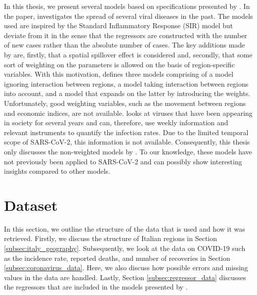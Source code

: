 \documentclass[12pt]{article}
\begin{document}
	In this thesis, we present several models based on specifications presented by \textcite{adda2016economic}. In the paper, \textcite{adda2016economic} investigates the spread of several viral diseases in the past. The models used are inspired by the Standard Inflammatory Response (SIR) model but deviate from it in the sense that the regressors are constructed with the number of new cases rather than the absolute number of cases. The key additions made by \textcite{adda2016economic} are, firstly, that a spatial spillover effect is considered and, secondly, that some sort of weighting on the parameters is allowed on the basis of region-specific variables. With this motivation, \textcite{adda2016economic} defines three models comprising of a model ignoring interaction between regions, a model taking interaction between regions into account, and a model that expands on the latter by introducing the weights. Unfortunately, good weighting variables, such as the movement between regions and economic indices, are not available. \textcite{adda2016economic} looks at viruses that have been appearing in society for several years and can, therefore, use weekly information and relevant instruments to quantify the infection rates. Due to the limited temporal scope of SARS-CoV-2, this information is not available. Consequently, this thesis only discusses the non-weighted models by \textcite{adda2016economic}. To our knowledge, these models have not previously been applied to SARS-CoV-2 and can possibly show interesting insights compared to other models.
	
	\section{Dataset} \label{sec:dataset}
	In this section, we outline the structure of the data that is used and how it was retrieved. Firstly, we discuss the structure of Italian regions in Section \ref{subsec:italy_geography}. Subsequently, we look at the data on COVID-19 such as the incidence rate, reported deaths, and number of recoveries in Section \ref{subsec:coronavirus_data}. Here, we also discuss how possible errors and missing values in the data are handled. Lastly, Section \ref{subsec:regressor_data} discusses the regressors that are included in the models presented by \textcite{adda2016economic}.
	
	\newpage
\end{document}

